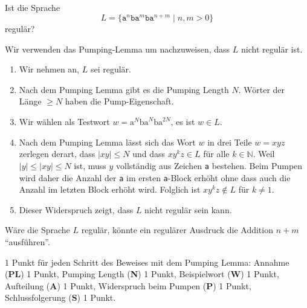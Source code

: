Ist die Sprache
\[
L=\{\texttt{a}^n\texttt{ba}^m\texttt{ba}^{n+m}\;|\;n,m>0\}
\]
regulär?


\begin{loesung}
Wir verwenden das Pumping-Lemma um nachzuweisen, dass $L$ nicht 
regulär ist.
\begin{enumerate}
\item
Wir nehmen an, $L$ sei regulär.
\item
Nach dem Pumping Lemma gibt es die Pumping Length $N$.
Wörter der Länge $\ge N$ haben die Pump-Eigenschaft.
\item
Wir wählen als Testwort
$w = \text{a}^N\text{ba}^N\text{ba}^{2N}$, es ist $w\in L$.
\item
Nach dem Pumping Lemma lässt sich das Wort $w$ in drei Teile $w=xyz$
zerlegen derart, dass $|xy|\le N$ und dass $xy^kz\in L$ für alle
$k\in\mathbb N$.
Weil $|y| \le |xy|\le N$ ist, muss $y$ vollständig aus Zeichen
\texttt{a} bestehen.
Beim Pumpen wird daher die Anzahl der \texttt{a} im ersten \texttt{a}-Block
erhöht ohne dass auch die Anzahl im letzten Block erhöht wird.
Folglich ist $xy^kz\not\in L$ für $k\ne 1$.
\item
Dieser Widerspruch zeigt, dass $L$ nicht regulär sein kann.
\qedhere
\end{enumerate}
\end{loesung}


\begin{diskussion}
Wäre die Sprache $L$ regulär, könnte ein regulärer Ausdruck die
Addition $n+m$ ``ausführen''.
\end{diskussion}

\begin{bewertung} 1 Punkt für jeden Schritt des Beweises mit dem
Pumping Lemma:
Annahme ({\bf PL}) 1 Punkt,
Pumping Length ({\bf N}) 1 Punkt,
Beispielwort ({\bf W}) 1 Punkt,
Aufteilung ({\bf A}) 1 Punkt,
Widerspruch beim Pumpen ({\bf P}) 1 Punkt,
Schlussfolgerung ({\bf S}) 1 Punkt.
\end{bewertung}

